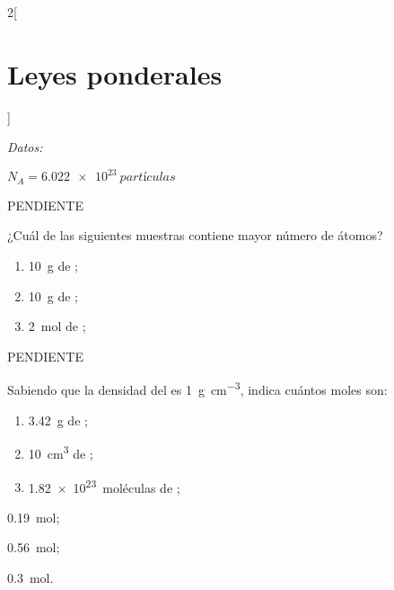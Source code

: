 \documentclass[10pt]{article}
\newenvironment{gexdatos}{
      \vspace{2pt}
      \noindent\textit{Datos:}
    }{\vspace{5pt}}
\begin{document}
\begin{multicols}{2}[
  \section{Leyes ponderales}
  ]
\begin{exercise}[
      tags    = {termodinámica, entalpía, entalpia de reacción, calor},
      topics  = {química, termoquímica, termodinámica},
      source  = {FQ 1B SAN 2015, p43, e34},
    ]
    \begin{gexdatos}
      \( N_A = \SI{6.022e23}{partículas}\)
    \end{gexdatos}
  \end{exercise}

  \begin{solution}
    PENDIENTE %
  \end{solution}




  \begin{exercise}[
      tags    = {termodinámica, entalpía, entalpia de reacción, calor},
      topics  = {química, termoquímica, termodinámica},
      source  = {FQ 1B OXF 2015, p43, e31},
    ]
    ¿Cuál de las siguientes muestras contiene mayor número de átomos?
    \begin{enumerate}
      \item \SI{10}{\gram} de ;
      \item \SI{10}{\gram} de ;
      \item \SI{2}{\mole} de ;
    \end{enumerate}
  \end{exercise}

  \begin{solution}
    PENDIENTE %
  \end{solution}




  \begin{exercise}[
      tags    = {termodinámica, entalpía, entalpia de reacción, calor},
      topics  = {química, termoquímica, termodinámica},
      source  = {FQ 1B OXF 2015, p43, e34},
    ]
    Sabiendo que la densidad del  es \SI{1}{\gram\per\cubic\centi\meter}, indica cuántos moles son:
    \begin{enumerate}
      \item \SI{3.42}{\gram} de ;
      \item \SI{10}{\cubic\centi\meter} de ;
      \item \SI{1.82e23}{moléculas} de ;
    \end{enumerate}
  \end{exercise}

  \begin{solution}
    \begin{enumerate*}
      \item \SI{0.19}{\mole};
      \item \SI{0.56}{\mole};
      \item \SI{0.3}{\mole}.
    \end{enumerate*}
  \end{solution}




\end{multicols}
\end{document}
